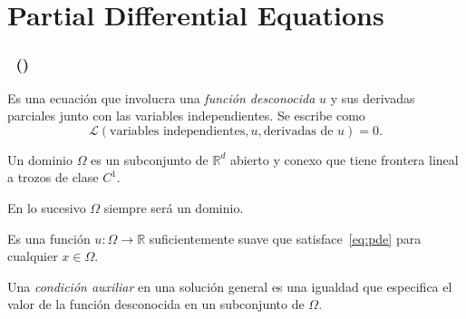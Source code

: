 \section{Partial Differential Equations}

\begin{frame}
	\frametitle{
		\secname~(\citeauthor[p.~2]{choksi_partial_2022})
	} %

	\begin{definition}
		Es una ecuación que involucra una \emph{función desconocida} $u$
		y sus derivadas parciales junto con las variables independientes.
		Se escribe como
		\begin{equation}
			\mathcal{L}
			\left(
			\text{variables independientes},
			u,
			\text{derivadas de $u$}
			\right)
			=0.
			\label{eq:pde}
		\end{equation}
	\end{definition}

	\begin{definition}[Dominio]
		Un dominio $\Omega$ es un subconjunto de $\mathbb{R}^{d}$ abierto
		y conexo que tiene frontera lineal a trozos de clase $C^{1}$.
	\end{definition}

	En lo sucesivo $\Omega$ siempre será un dominio.

	\begin{definition}
		Es una función $u\colon\Omega\to\mathbb{R}$ suficientemente suave
		que satisface~\eqref{eq:pde} para cualquier $x\in\Omega$.
	\end{definition}

	\begin{definition}
		Una \emph{condición auxiliar} en una solución general es una
		igualdad que especifica el valor de la función desconocida en un
		subconjunto de $\Omega$.
	\end{definition}
\end{frame}

